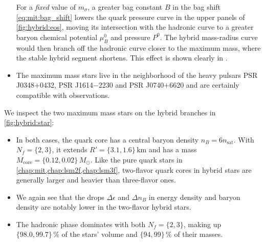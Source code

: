 \begin{itemize}
      For a \emph{fixed} value of $m_\sigma$,
      a greater bag constant $B$ in the bag shift \eqref{eq:mit:bag_shift}
      lowers the quark pressure curve in the upper panels of \cref{fig:hybrid:eos},
      moving its intersection with the hadronic curve to a greater baryon chemical potential $\mu_B^0$ and pressure $P^0$.
      The hybrid mass-radius curve would then branch off the hadronic curve closer to the maximum mass,
      where the stable hybrid segment shortens.
      This effect is shown clearly in \cite[figure 14]{ref:lsm3f_hybrid_stars}.
\item The maximum mass stars live in the neighborhood of the heavy pulsars PSR J0348$+$0432, PSR J1614$-$2230 and PSR J0740$+$6620 and are certainly compatible with observations.
\end{itemize}

We inspect the two maximum mass stars on the hybrid branches in \cref{fig:hybrid:star}:
\begin{itemize}
\item In both cases, the quark core has a central baryon density $n_B = 6 n_\text{sat}$.
      With $N_f=\{2,3\}$, it extends $R' = \{3.1,1.6\} \, \si{\kilo\meter}$ and has a mass $M_\text{core} = \{0.12,0.02\} \, M_\odot$.
      Like the pure quark stars in \cref{chap:mit,chap:lsm2f,chap:lsm3f},
      two-flavor quark cores in hybrid stars are generally larger and heavier than three-flavor ones.
\item We again see that the drops $\Delta \epsilon$ and $\Delta n_B$ in energy density and baryon density 
      are notably lower in the two-flavor hybrid stars.
\item The hadronic phase dominates with both $N_f=\{2,3\}$, 
      making up $\{98.0,99.7\} \, \si{\percent}$ of the stars' volume and $\{94,99\} \, \si{\percent}$ of their masses.
\end{itemize}

